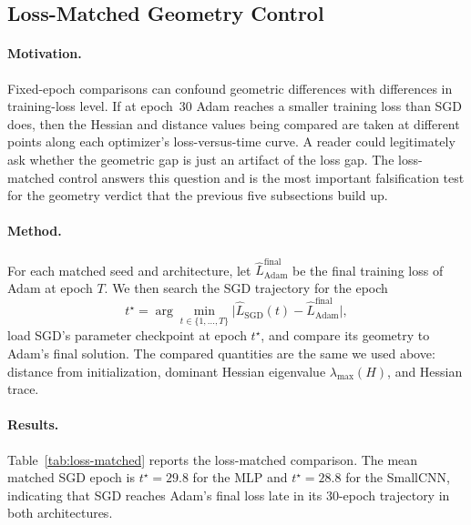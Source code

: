 \documentclass[11pt]{article}
\begin{document}
\subsection{Loss-Matched Geometry Control}
\label{sec:loss-matched}

\paragraph{Motivation.} Fixed-epoch comparisons can confound geometric differences with differences in training-loss level. If at epoch~30 Adam reaches a smaller training loss than SGD does, then the Hessian and distance values being compared are taken at different points along each optimizer's loss-versus-time curve. A reader could legitimately ask whether the geometric gap is just an artifact of the loss gap. The loss-matched control answers this question and is the most important falsification test for the geometry verdict that the previous five subsections build up.

\paragraph{Method.} For each matched seed and architecture, let $\widehat L_{\mathrm{Adam}}^{\mathrm{final}}$ be the final training loss of Adam at epoch $T$. We then search the SGD trajectory for the epoch
\[
t^\star = \arg\min_{t\in\{1,\dots,T\}} \big| \widehat L_{\mathrm{SGD}}(t) - \widehat L_{\mathrm{Adam}}^{\mathrm{final}}\big|,
\]
load SGD's parameter checkpoint at epoch $t^\star$, and compare its geometry to Adam's final solution. The compared quantities are the same we used above: distance from initialization, dominant Hessian eigenvalue $\lambda_{\max}(H)$, and Hessian trace.

\paragraph{Results.} Table~\ref{tab:loss-matched} reports the loss-matched comparison. The mean matched SGD epoch is $t^\star = 29.8$ for the MLP and $t^\star = 28.8$ for the SmallCNN, indicating that SGD reaches Adam's final loss late in its 30-epoch trajectory in both architectures.
\end{document}
